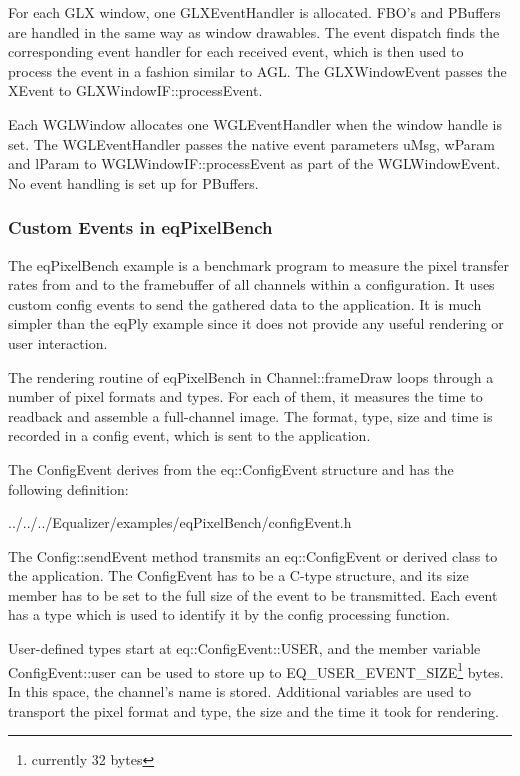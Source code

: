 \documentclass[10pt,a4]{scrartcl}
\begin{document}
For each GLX window, one \textsf{GLXEventHandler} is allocated. FBO's and
PBuffers are handled in the same way as window drawables. The event dispatch
finds the corresponding event handler for each received event, which is then
used to process the event in a fashion similar to AGL. The
\textsf{GLXWindowEvent} passes the \textsf{XEvent} to
\textsf{GLXWindowIF::\-process\-Event}.

Each \textsf{WGLWindow} allocates one \textsf{WGLEventHandler} when the
window handle is set. The WGLEventHandler passes the native event
parameters \textsf{uMsg}, \textsf{wParam} and \textsf{lParam} to
\textsf{WGL\-Win\-dowIF::processEvent} as part of the
\textsf{WGLWindowEvent}. No event handling is set up for PBuffers.

\subsubsection{Custom Events in eqPixelBench}

The \textsf{eqPixelBench} example is a benchmark program to measure the
pixel transfer rates from and to the framebuffer of all channels within
a configuration. It uses custom config events to send the gathered data
to the application. It is much simpler than the \textsf{eqPly} example
since it does not provide any useful rendering or user interaction.

The rendering routine of \textsf{eqPixelBench} in
\textsf{Channel::frameDraw} loops through a number of pixel formats and
types. For each of them, it measures the time to readback and assemble a
full-channel image. The format, type, size and time is recorded in a
config event, which is sent to the application.

The \textsf{ConfigEvent} derives from the \textsf{eq::ConfigEvent}
structure and has the following definition:

{\footnotesize
  {../../../Equalizer/examples/eqPixelBench/configEvent.h}}


The \textsf{Config::sendEvent} method transmits an
\textsf{eq::ConfigEvent} or derived class to the application. The
ConfigEvent has to be a C-type structure, and its \textsf{size}
member has to be set to the full size of the event to be transmitted.
Each event has a type which is used to identify it by the config 
processing function.

User-defined types start at \textsf{eq::ConfigEvent::USER}, and the
member variable \textsf{ConfigEvent::user} can be used to store up to
\textsf{EQ\_USER\_EVENT\_SIZE}\footnote{currently 32 bytes} bytes. In
this space, the channel's name is stored. Additional variables are used
to transport the pixel format and type, the size and the time it took
for rendering.
\end{document}
